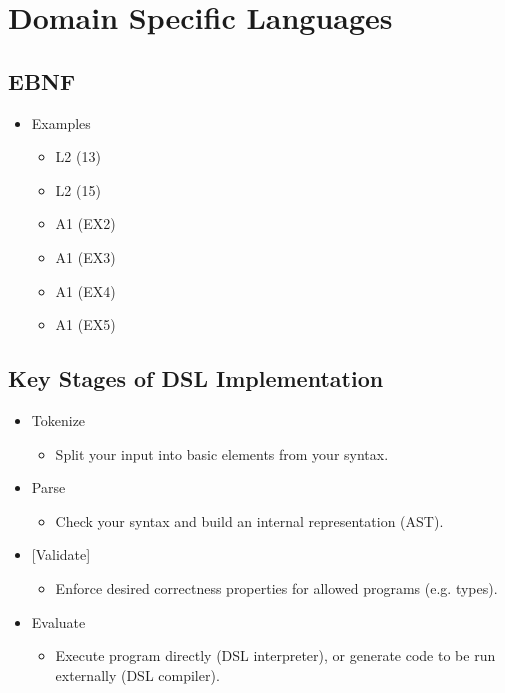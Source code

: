 \documentclass{article}
\begin{document}
\section{Domain Specific Languages}

\subsection{EBNF}

\begin{itemize}
    \item Examples
    \begin{itemize}
        \item L2 (13)
        \item L2 (15)
        \item A1 (EX2)
        \item A1 (EX3)
        \item A1 (EX4)
        \item A1 (EX5)
    \end{itemize}
\end{itemize}

\subsection{Key Stages of DSL Implementation}

\begin{itemize}
    \item Tokenize
    \begin{itemize}
        \item Split your input into basic elements from your syntax.
    \end{itemize}
    \item Parse
    \begin{itemize}
        \item Check your syntax and build an internal representation (AST).
    \end{itemize}
    \item {[Validate]}
    \begin{itemize}
        \item Enforce desired correctness properties for allowed programs (e.g. types).
    \end{itemize}
    \item Evaluate
    \begin{itemize}
        \item Execute program directly (DSL interpreter), or generate code to be run externally (DSL compiler).
    \end{itemize}
\end{itemize}
\end{document}
